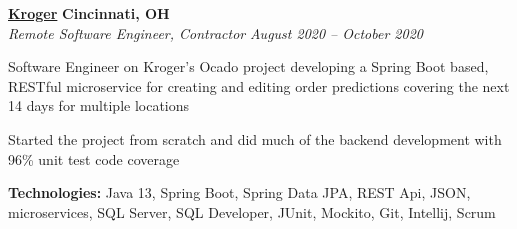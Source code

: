 %
    \headerrow
        {\textbf{\href{https://www.kroger.com/}{Kroger}}}
        {\textbf{Cincinnati, OH}}
    \\
    \headerrow
        {\emph{Remote Software Engineer, Contractor}}
        {\emph{August 2020 -- October 2020}}
    \begin{itemize*}
        \item Software Engineer on Kroger's Ocado project developing a Spring Boot based, RESTful microservice for creating and editing
            order predictions covering the next 14 days for multiple locations
        \item Started the project from scratch and did much of the backend development with 96\% unit test code coverage
    \end{itemize*}

    \hspace{1.0em}
        {\textbf{Technologies:} Java 13, Spring Boot, Spring Data JPA, REST Api, JSON, microservices, SQL Server, SQL Developer, JUnit, Mockito,
            Git, Intellij, Scrum}

